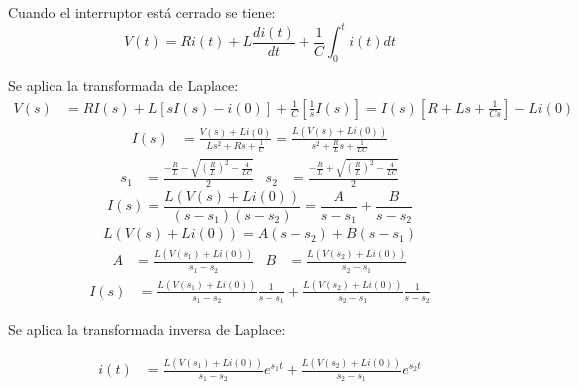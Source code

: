 
Cuando el interruptor está cerrado se tiene:
\begin{equation*}
  V(t) = Ri(t) + L\frac{di(t)}{dt} + \frac{1}{C}\int_{0}^ti(t)dt
\end{equation*}

Se aplica la transformada de Laplace:
\begin{align*}
  V(s) &= RI(s)
  + L \left[ sI(s) - i(0) \right]
  + \frac{1}{C} \left[ \frac{1}{s} I(s) \right] \nonumber
  = I(s) \left[R + Ls +\frac{1}{Cs}\right] - Li(0)
\end{align*}
\begin{align*}
  I(s) &= \frac{V(s) + Li(0)}{Ls^2 + Rs + \frac{1}{C}}
  = \frac{L\left(V(s) + Li(0)\right)}{s^2 + \frac{R}{L}s + \frac{1}{LC}}
\end{align*}
\begin{align*}
  s_1 &= \frac{-\frac{R}{L} - \sqrt{\left(\frac{R}{L}\right)^2-\frac{4}{LC}}}{2}
  &
  s_2 &= \frac{-\frac{R}{L} + \sqrt{\left(\frac{R}{L}\right)^2-\frac{4}{LC}}}{2}
\end{align*}
\begin{equation*}
  I(s) = \frac{L\left(V(s) + Li(0)\right)}{(s-s_1)(s-s_2)}
  = \frac{A}{s-s_1} + \frac{B}{s-s_2}
\end{equation*}
\begin{align*}
  L\left(V(s) + Li(0)\right) = A(s-s_2) + B(s-s_1)
\end{align*}
\begin{align*}
  A &= \frac{L\left(V(s_1) + Li(0)\right)}{s_1-s_2}
  &
  B &= \frac{L\left(V(s_2) + Li(0)\right)}{s_2-s_1}
\end{align*}
\begin{align*}
  I(s) &= \frac{L\left(V(s_1) + Li(0)\right)}{s_1-s_2}\frac{1}{s-s_1} +
  \frac{L\left(V(s_2) + Li(0)\right)}{s_2-s_1}\frac{1}{s-s_2}
\end{align*}

Se aplica la transformada inversa de Laplace:

\begin{align*}
  i(t) &=
  \frac{L\left(V(s_1) + Li(0)\right)}{s_1-s_2}e^{s_1t} +
  \frac{L\left(V(s_2) + Li(0)\right)}{s_2-s_1}e^{s_2t}
\end{align*}
